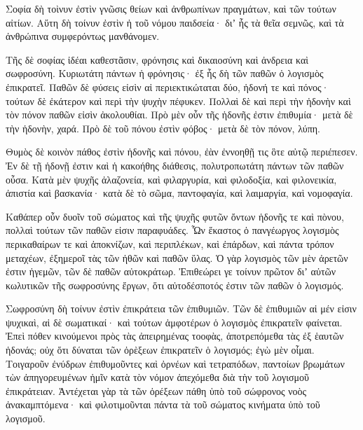 {Σοφία δὴ τοὶνυν ἐστὶν γνῶσις θείων καὶ ἀνθρωπίνων πραγμάτων, καὶ τῶν τούτων αἰτίων.
Αὕτη δὴ τοίνυν ἐστὶν ἠ τοῦ νόμου παιδσεία· διʼ ἧς τὰ θεῖα σεμνῶς, καὶ τὰ ἀνθρώπινα συμφερόντως μανθάνομεν.
\par }{\PP {}Τῆς δὲ σοφίας ἰδέαι καθεστᾶσιν, φρόνησις καὶ δικαιοσύνη καὶ ἀνδρεια καὶ σωφροσύνη.
Κυριωτάτη πάντων ἡ φρόνησις· ἐξ ἧς δὴ τῶν παθῶν ὁ λογισμὸς ἐπικρατεῖ.
Παθῶν δὲ φύσεις εἰσὶν αἱ περιεκτικώταται δύο, ἡδονή τε καὶ πόνος· τούτων δὲ ἐκάτερον καὶ περὶ τὴν ψυχὴν πέφυκεν.
Πολλαὶ δὲ καὶ περὶ τὴν ἡδονὴν καὶ τὸν πόνον παθῶν εἰσὶν ἀκολουθίαι.
Πρὸ μὲν οὖν τῆς ἡδονῆς ἐστιν ἐπιθυμία· μετὰ δὲ τὴν ἡδονὴν, χαρά.
Πρὸ δὲ τοῦ πόνου ἐστὶν φόβος· μετὰ δὲ τὸν πόνον, λύπη.
\par }{\PP {}Θυμὸς δὲ κοινὸν πάθος ἐστὶν ἡδονῆς καὶ πόνου, ἐὰν ἐννοηθῇ τις ὃτε αὐτῷ περιέπεσεν.
Ἐν δὲ τῇ ἡδονῇ ἐστιν καὶ ἡ κακοήθης διάθεσις, πολυτροπωτάτη πάντων τῶν παθῶν οὖσα.
Κατὰ μὲν ψυχῆς ἀλαζονεία, καὶ φιλαργυρία, καὶ φιλοδοξία, καὶ φιλονεικία, ἀπιστία καὶ βασκανία·
κατὰ δὲ τὸ σῶμα, παντοφαγία, καὶ λαιμαργία, καὶ νομοφαγία.
\par }{\PP {}Καθάπερ οὖν δυοῖν τοῦ σώματος καὶ τῆς ψυχῆς φυτῶν ὄντων ἡδονῆς τε καὶ πὸνου, πολλαὶ τούτων τῶν παθῶν εἰσιν παραφυάδες.
Ὧν ἕκαστος ὁ πανγέωργος λογισμὸς περικαθαίρων τε καὶ ἀποκνίζων, καὶ περιπλέκων, καὶ ἐπάρδων, καὶ πάντα τρόπον μεταχέων, ἐξημεροῖ τὰς τῶν ἠθῶν καὶ παθῶν ὕλας.
Ὁ γὰρ λογισμὸς τῶν μὲν ἀρετῶν ἐστιν ἡγεμῶν, τῶν δὲ παθῶν αὐτοκράτωρ. Ἐπιθεώρει γε τοίνυν πρῶτον διʼ αὐτῶν κωλυτικῶν τῆς σωφροσύνης ἔργων, ὅτι αὐτοδέσποτός ἐστιν τῶν παθῶν ὁ λογισμός.
\par }{\PP {}Σωφροσύνη δὴ τοίνυν ἐστὶν ἐπικράτεια τῶν ἐπιθυμιῶν.
Τῶν δὲ ἐπιθυμιῶν αἱ μέν εἰσιν ψυχικαὶ, αἱ δὲ σωματικαί· καὶ τούτων ἀμφοτέρων ὁ λογισμὸς ἐπικρατεῖν φαίνεται.
Ἐπεὶ πόθεν κινούμενοι πρὸς τὰς ἀπειρημένας τοοφὰς, ἀποτρεπόμεθα τὰς ἐξ ἑαυτῶν ἡδονάς; οὐχ ὅτι δύναται τῶν ὀρὲξεων ἐπικρατεῖν ὁ λογισμός; ἐγὼ μὲν οἶμαι.
Τοιγαροῦν ἐνύδρων ἐπιθυμοῦντες καὶ ὀρνέων καὶ τετραπόδων, παντοίων βρωμάτων τὼν ἀπηγορευμένων ἡμῖν κατὰ τὸν νόμον ἀπεχόμεθα διὰ τὴν τοῦ λογισμοῦ ἐπικράτειαν.
Ἀντέχεται γὰρ τὰ τῶν ὀρέξεων πάθη ὑπὸ τοῦ σώφρονος νοὸς ἀνακαμπτόμενα· καὶ φιλοτιμοῦνται πάντα τὰ τοῦ σώματος κινήματα ὑπὸ τοῦ λογισμοῦ.

}
